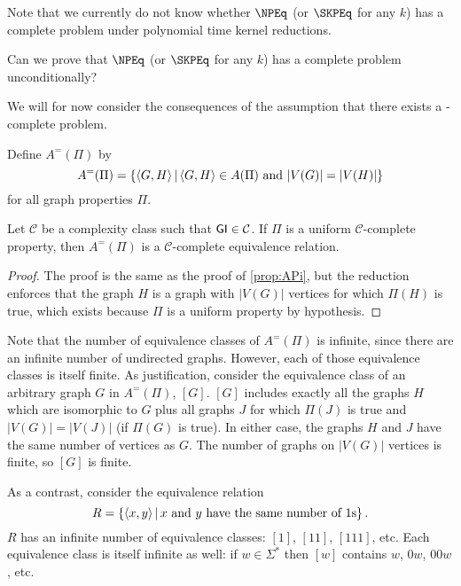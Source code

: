 Note that we currently do not know whether $\NPEq$ (or $\SKPEq$ for any $k$) has a complete problem under polynomial time kernel reductions.
\begin{openproblem}
  Can we prove that $\NPEq$ (or $\SKPEq$ for any $k$) has a complete problem unconditionally?
\end{openproblem}

We will for now consider the consequences of the assumption that there exists a \CEq-complete problem.

Define $A^=(\Pi)$ by
\begin{displaymath}
  A^=(\Pi) = \left\{ \langle G,H\rangle \,\middle|\, \langle G,H\rangle\in A(\Pi) \text{ and } |V(G)|=|V(H)|\right\}
\end{displaymath}
for all graph properties $\Pi$.

\begin{proposition}\label{prop:APieq}
  Let $\mathcal{C}$ be a complexity class such that ${\mathsf{GI}}\in\mathcal{C}$.
  If $\Pi$ is a uniform $\mathcal{C}$-complete property, then $A^=(\Pi)$ is a $\mathcal{C}$-complete equivalence relation.
\end{proposition}
\begin{proof}
  The proof is the same as the proof of \autoref{prop:APi}, but the reduction enforces that the graph $H$ is a graph with $|V(G)|$ vertices for which $\Pi(H)$ is true, which exists because $\Pi$ is a uniform property by hypothesis.
\end{proof}

Note that the number of equivalence classes of $A^=(\Pi)$ is infinite, since there are an infinite number of undirected graphs.
However, each of those equivalence classes is itself finite.
As justification, consider the equivalence class of an arbitrary graph $G$ in $A^=(\Pi)$, $[G]$.
$[G]$ includes exactly all the graphs $H$ which are isomorphic to $G$ plus all graphs $J$ for which $\Pi(J)$ is true and $|V(G)|=|V(J)|$ (if $\Pi(G)$ is true).
In either case, the graphs $H$ and $J$ have the same number of vertices as $G$.
The number of graphs on $|V(G)|$ vertices is finite, so $[G]$ is finite.

As a contrast, consider the equivalence relation
\begin{displaymath}
  R=\left\{\langle x,y\rangle \,\middle|\, x\text{ and }y\text{ have the same number of }1\textnormal{s}\right\}.
\end{displaymath}
$R$ has an infinite number of equivalence classes: $[1]$, $[11]$, $[111]$, etc.
Each equivalence class is itself infinite as well: if $w\in\Sigma^*$ then $[w]$ contains $w$, $0w$, $00w$, etc.

